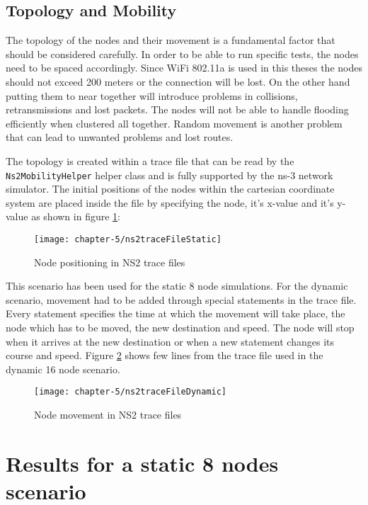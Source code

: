 \subsection{Topology and Mobility}

The topology of the nodes and their movement is a fundamental factor that should be considered carefully. In order to be able to run specific tests, the nodes need to be spaced accordingly. Since WiFi 802.11a is used in this theses the nodes should not exceed 200 meters or the connection will be lost. On the other hand putting them to near together will introduce problems in collisions, retransmissions and lost packets. The nodes will not be able to handle flooding efficiently when clustered all together. Random movement is another problem that can lead to unwanted problems and lost routes.
 
The topology is created within a trace file that can be read by the \texttt{Ns2MobilityHelper} helper class and is fully supported by the ns-3 network simulator. The initial positions of the nodes within the cartesian coordinate system are placed inside the file by specifying the node, it's x-value and it's y-value as shown in figure \ref{fig:ns2traceFileStatic}:

\begin{figure}[H]
  \centering
  \texttt{[image: chapter-5/ns2traceFileStatic]}
  \caption{Node positioning in NS2 trace files}
  \label{fig:ns2traceFileStatic}
\end{figure}

\clearpage

This scenario has been used for the static 8 node simulations. For the dynamic scenario, movement had to be added through special statements in the trace file. Every statement specifies the time at which the movement will take place, the node which has to be moved, the new destination and speed. The node will stop when it arrives at the new destination or when a new statement changes its course and speed. Figure \ref{fig:ns2traceFileDynamic} shows few lines from the trace file used in the dynamic 16 node scenario.

\begin{figure}[H]
  \centering
  \texttt{[image: chapter-5/ns2traceFileDynamic]}
  \caption{Node movement in NS2 trace files}
  \label{fig:ns2traceFileDynamic}
\end{figure}

\clearpage

\section{Results for a static 8 nodes scenario}

